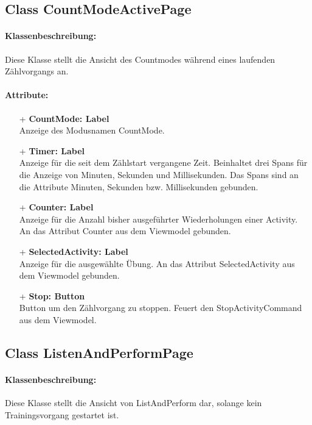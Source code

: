 \documentclass[a4paper,12pt]{article}
\begin{document}
\subsection{Class CountModeActivePage}
\paragraph{Klassenbeschreibung:}
Diese Klasse stellt die Ansicht des Countmodes während eines laufenden Zählvorgangs an.
\paragraph{Attribute:}
	\begin{itemize}
	\item[+] \textbf{CountMode: Label} \\ Anzeige des Modusnamen CountMode.
	\item[+] \textbf{Timer: Label} \\ Anzeige für die seit dem Zählstart vergangene Zeit. Beinhaltet drei Spans für die Anzeige von Minuten, Sekunden und Millisekunden. Das Spans sind an die Attribute Minuten, Sekunden bzw. Millisekunden gebunden.
	\item[+] \textbf{Counter: Label} \\ Anzeige für die Anzahl bisher ausgeführter Wiederholungen einer Activity. An das Attribut Counter aus dem Viewmodel gebunden.
	\item[+] \textbf{SelectedActivity: Label} \\Anzeige für die ausgewählte Übung. An das Attribut SelectedActivity aus dem Viewmodel gebunden.
	\item[+] \textbf{Stop: Button} \\ Button um den Zählvorgang zu stoppen. Feuert den StopActivityCommand aus dem Viewmodel.
	\end{itemize}

\subsection{Class ListenAndPerformPage}
\paragraph{Klassenbeschreibung:}
Diese Klasse stellt die Ansicht von ListAndPerform dar, solange kein Trainingsvorgang gestartet ist.
\end{document}
